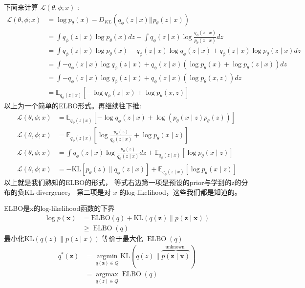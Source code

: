 \documentclass[UTF8]{ctexart}
\begin{document}
下面来计算 $\mathcal{L}(\theta, \phi ; x)$ :
$$
\begin{aligned}
\mathcal{L}(\theta, \phi ; x)&=\log p_{\theta}(x)-D_{K L}\left(q_{\phi}(z \mid x)|| p_{\theta}(z \mid x)\right) \\
&=\int q_{\phi}(z \mid x) \log p_{\theta}(x) d z-\int q_{\phi}(z \mid x) \log \frac{q_{\phi}(z \mid x)}{p_{\theta}(z \mid x)} d z \\
&=\int q_{\phi}(z \mid x) \log p_{\theta}(x)-q_{\phi}(z \mid x) \log q_{\phi}(z \mid x)+q_{\phi}(z \mid x) \log p_{\theta}(z \mid x) d z \\
&=\int-q_{\phi}(z \mid x) \log q_{\phi}(z \mid x)+q_{\phi}(z \mid x)\left(\log p_{\theta}(x)+\log p_{\theta}(z \mid x)\right) d z \\
&=\int-q_{\phi}(z \mid x) \log q_{\phi}(z \mid x)+q_{\phi}(z \mid x)\left(\log p_{\theta}(x, z)\right) d z \\
&=\mathbb{E}_{q_{\phi}(z \mid x)}\left[-\log q_{\phi}(z \mid x)+\log p_{\theta}(x, z)\right]
\end{aligned}
$$
以上为一个简单的ELBO形式。再继续往下推:
$$
\begin{aligned}
\mathcal{L}(\theta, \phi ; x) &=\mathbb{E}_{q_{\phi}(z \mid x)}\left[-\log q_{\phi}(z \mid x)+\log \left(p_{\theta}(x \mid z) p_{\theta}(z)\right)\right] \\
\mathcal{L}(\theta, \phi ; x) &=\mathbb{E}_{q_{\phi}(z \mid x)}\left[\log \frac{p_{\theta}(z)}{q_{\phi}(z \mid x)}+\log p_{\theta}(x \mid z)\right] \\
\mathcal{L}(\theta, \phi ; x) &=\int q_{\phi}(z \mid x) \log \frac{p_{\theta}(z)}{q_{\phi}(z \mid x)} d z+\mathbb{E}_{q_{\phi}(z \mid x)}\left[\log p_{\theta}(x \mid z)\right] \\
\mathcal{L}(\theta, \phi ; x) &=-\mathrm{KL}\left[p_{\theta}(z) \| q_{\phi}(z \mid x)\right]+\mathbb{E}_{q_{\phi}(z \mid x)}\left[\log p_{\theta}(x \mid z)\right]
\end{aligned}
$$
以上就是我们熟知的ELBO的形式，
等式右边第一项是预设的prior与学到的z的分布的负KL-divergence，
第二项是对 $x$ 的log-likelihood，这些我们都是知道的。

ELBO是x的log-likelihood函数的下界
$$
\begin{aligned}
\log p(\boldsymbol{x}) &=\mathrm{ELBO}(q)+\mathrm{KL}(q(\boldsymbol{z}) \| p(\boldsymbol{z} \mid \boldsymbol{x})) \\
& \geq \operatorname{ELBO}(q)
\end{aligned}
$$
最小化$\mathrm{KL}(q(z) \| p(z \mid x))$ 等价于最大化 $\operatorname{ELBO}(q)$
$$
\begin{aligned}
q^{*}(\boldsymbol{z}) &=\underset{q(\boldsymbol{z}) \in Q}{\operatorname{argmin}} \mathrm{KL}(q(z) \| \overbrace{p(\boldsymbol{z} \mid \boldsymbol{x})}^{\text {unknown }}) \\
&=\underset{q(z) \in Q}{\operatorname{argmax}} \operatorname{ELBO}(q)
\end{aligned}
$$
\end{document}
